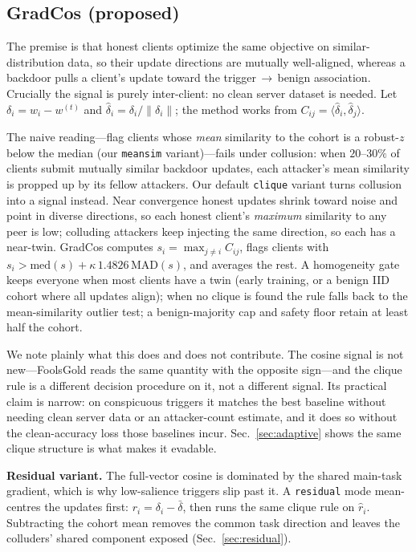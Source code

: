 \subsection{GradCos (proposed)}

The premise is that honest clients optimize the same objective on
similar-distribution data, so their update directions are mutually well-aligned,
whereas a backdoor pulls a client's update toward the trigger\,$\rightarrow$\,benign
association. Crucially the signal is purely inter-client: no clean server dataset
is needed. Let $\delta_i = w_i - w^{(t)}$ and $\hat\delta_i =
\delta_i/\|\delta_i\|$; the method works from $C_{ij} = \langle
\hat\delta_i,\hat\delta_j\rangle$.

The naive reading---flag clients whose \emph{mean} similarity to the cohort is a
robust-$z$ below the median (our \texttt{meansim} variant)---fails under
collusion: when $20$--$30\%$ of clients submit mutually similar backdoor updates,
each attacker's mean similarity is propped up by its fellow attackers. Our
default \texttt{clique} variant turns collusion into a signal instead. Near
convergence honest updates shrink toward noise and point in diverse directions,
so each honest client's \emph{maximum} similarity to any peer is low; colluding
attackers keep injecting the same direction, so each has a near-twin. GradCos
computes $s_i=\max_{j\neq i} C_{ij}$, flags clients with $s_i > \mathrm{med}(s) +
\kappa\,1.4826\,\mathrm{MAD}(s)$, and averages the rest. A homogeneity gate keeps
everyone when most clients have a twin (early training, or a benign IID cohort
where all updates align); when no clique is found the rule falls back to the
mean-similarity outlier test; a benign-majority cap and safety floor retain at
least half the cohort.

We note plainly what this does and does not contribute. The cosine signal is not
new---FoolsGold reads the same quantity with the opposite sign---and the clique
rule is a different decision procedure on it, not a different signal. Its
practical claim is narrow: on conspicuous triggers it matches the best baseline
without needing clean server data or an attacker-count estimate, and it does so
without the clean-accuracy loss those baselines incur. Sec.~\ref{sec:adaptive}
shows the same clique structure is what makes it evadable.

\textbf{Residual variant.} The full-vector cosine is dominated by the shared
main-task gradient, which is why low-salience triggers slip past it. A
\texttt{residual} mode mean-centres the updates first: $r_i=\delta_i-\bar\delta$,
then runs the same clique rule on $\hat r_i$. Subtracting the cohort mean removes
the common task direction and leaves the colluders' shared component exposed
(Sec.~\ref{sec:residual}).

